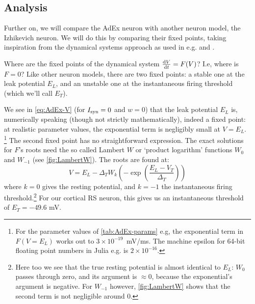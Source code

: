 

\subsection{Analysis}

Further on, we will compare the AdEx neuron with another neuron model, the Izhikevich neuron. We will do this by comparing their fixed points, taking inspiration from the dynamical systems approach as used in e.g. \cite{Strogatz1994NonlinearDynamicsChaos} and \cite{Izhikevich2007DynamicalSystemsNeuroscience}.

Where are the fixed points of the dynamical system $\frac{\mathrm{d}V}{\mathrm{d}t} = F(V)$? I.e, where is $F = 0$? Like other neuron models, there are two fixed points: a stable one at the leak potential $E_L$, and an unstable one at the instantaneous firing threshold (which we'll call $E_T$).

We see in \cref{eq:AdEx-V} (for $I_{\text{syn}} = 0$ and $w = 0$) that the leak potential $E_L$ is, numerically speaking (though not strictly mathematically), indeed a fixed point: at realistic parameter values, the exponential term is negligibly small at $V = E_L$.
\footnote{
    For the parameter values of \cref{tab:AdEx-params} e.g, the exponential term in $F(V=E_L)$ works out to $3×10^{-19}$~mV/ms. The machine epsilon for 64-bit floating point numbers in Julia e.g. is $2×10^{-16}$.
}
The second fixed point has no straightforward expression. The exact solutions for $F$'s roots need the so called Lambert $W$ or `product logarithm' functions $W_0$ and $W_{-1}$ (see \cref{fig:LambertW}). The roots are found at:
\begin{equation}
    V = E_L - Δ_T W_k \left( -\exp\left( \frac{E_L - V_T}{Δ_T} \right) \right) \label{eq:LambertW}
\end{equation}
where $k = 0$ gives the resting potential, and $k = -1$ the instantaneous firing threshold.\footnote{
    Here too we see that the true resting potential is almost identical to $E_L$: $W_0$ passes through zero, and its argument is $≈ 0$, because the exponential's argument is negative. For $W_{-1}$ however, \cref{fig:LambertW} shows that the second term is not negligible around $0$.}
For our cortical RS neuron, this gives us an instantaneous threshold of $E_T = -49.6$ mV.

